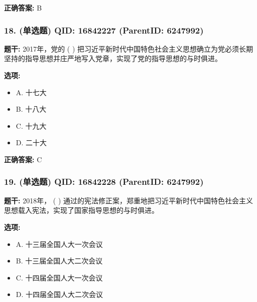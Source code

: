 \documentclass[12pt,UTF8]{ctexart}
\begin{document}
\textbf{正确答案:}
B

\vspace{0.3em}\hrulefill\vspace{0.7em}

\subsubsection*{18. (单选题) \small QID: 16842227 (ParentID: 6247992)}

\textbf{题干:}
2017年，党的 ( ) 把习近平新时代中国特色社会主义思想确立为党必须长期坚持的指导思想并庄严地写入党章，实现了党的指导思想的与时俱进。



\textbf{选项:}
\begin{itemize}[leftmargin=*]

  \item A. 十七大

  \item B. 十八大

  \item C. 十九大

  \item D. 二十大

\end{itemize}

\textbf{正确答案:}
C

\vspace{0.3em}\hrulefill\vspace{0.7em}

\subsubsection*{19. (单选题) \small QID: 16842228 (ParentID: 6247992)}

\textbf{题干:}
2018年， ( ) 通过的宪法修正案，郑重地把习近平新时代中国特色社会主义思想载入宪法，实现了国家指导思想的与时俱进。



\textbf{选项:}
\begin{itemize}[leftmargin=*]

  \item A. 十三届全国人大一次会议

  \item B. 十三届全国人大二次会议

  \item C. 十四届全国人大一次会议

  \item D. 十四届全国人大二次会议

\end{itemize}
\end{document}
